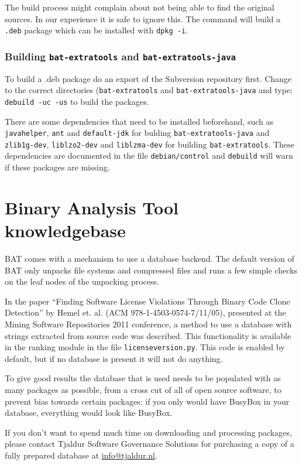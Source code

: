 \documentclass[10pt,a4paper]{article}
\begin{document}
The build process might complain about not being able to find the original
sources. In our experience it is safe to ignore this. The command will build a
\texttt{.deb} package which can be installed with \texttt{dpkg -i}.

\subsubsection{Building \texttt{bat-extratools} and
\texttt{bat-extratools-java}}

To build a .deb package do an export of the Subversion repository first. Change
to the correct directories (\texttt{bat-extratools} and 
\texttt{bat-extratools-java} and type: \texttt{debuild -uc -us} to
build the packages.

There are some dependencies that need to be installed beforehand, such as
\texttt{javahelper}, \texttt{ant} and \texttt{default-jdk} for bulding
\texttt{bat-extratools-java} and \texttt{zlib1g-dev}, \texttt{liblzo2-dev}
and \texttt{liblzma-dev} for building \texttt{bat-extratools}. These
dependencies are documented in the file \texttt{debian/control} and
\texttt{debuild} will warn if these packages are missing.

\section{Binary Analysis Tool knowledgebase}

BAT comes with a mechanism to use a database backend. The default version of
BAT only unpacks file systems and compressed files and runs a few simple checks
on the leaf nodes of the unpacking process.

In the paper ``Finding Software License Violations Through Binary Code Clone
Detection'' by Hemel et. al. (ACM 978-1-4503-0574-7/11/05), presented at
the Mining Software Repositories 2011 conference, a method to use a database
with strings extracted from source code was described. This functionality is
available in the ranking module in the file \texttt{licenseversion.py}. This
code is enabled by default, but if no database is present it will not do
anything.

To give good results the database that is used needs to be populated with as
many packages as possible, from a cross cut of all of open source software, to
prevent bias towards certain packages: if you only would have BusyBox in your
database, everything would look like BusyBox.

If you don't want to spend much time on downloading and processing
packages, please contact Tjaldur Software Governance Solutions for
purchasing a copy of a fully prepared database at \url{info@tjaldur.nl}.
\end{document}
